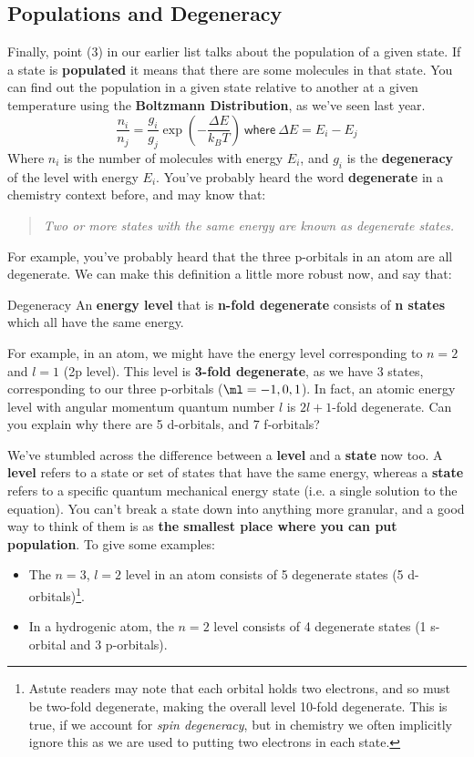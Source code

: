 \subsection{Populations and Degeneracy}
Finally, point (3) in our earlier list talks about the population of a given state. If a state is \textbf{populated} it means that there are some molecules in that state. You can find out the population in a given state relative to another at a given temperature using the \textbf{Boltzmann Distribution}, as we've seen last year. 
\begin{equation*}
\frac{n_i}{n_j} = \frac{g_i}{g_j}\exp\left(-\frac{\Delta E}{k_BT}\right) ~\mathsf{where}~ \Delta E = E_i - E_j
\end{equation*}
Where $n_i$ is the number of molecules with energy $E_i$, and $g_i$ is the \textbf{degeneracy} of the level with energy $E_i$. You've probably heard the word \textbf{degenerate} in a chemistry context before, and may know that:
\begin{quote}
\textit{Two or more states with the same energy are known as degenerate states.}
\end{quote}
For example, you've probably heard that the three p-orbitals in an atom are all degenerate. We can make this definition a little more robust now, and say that:

\begin{key}{Degeneracy}
An \textbf{energy level} that is \textbf{n-fold degenerate} consists of \textbf{n states} which all have the same energy.
\end{key}

For example, in an atom, we might have the energy level corresponding to $n=2$ and $l=1$ (2p level). This level is \textbf{3-fold degenerate}, as we have 3 states, corresponding to our three p-orbitals ($\ml = -1, 0, 1$). In fact, an atomic energy level with angular momentum quantum number $l$ is $2l+1$-fold degenerate. Can you explain why there are 5 d-orbitals, and 7 f-orbitals?

We've stumbled across the difference between a \textbf{level} and a \textbf{state} now too. A \textbf{level} refers to a state or set of states that have the same energy, whereas a \textbf{state} refers to a specific quantum mechanical energy state (i.e. a single solution to the \schro equation). You can't break a state down into anything more granular, and a good way to think of them is as \textbf{the smallest place where you can put population}. To give some examples:
\begin{itemize}
\item The $n=3$, $l=2$ level in an atom consists of 5 degenerate states (5 d-orbitals)\footnote{Astute readers may note that each orbital holds two electrons, and so must be two-fold degenerate, making the overall level 10-fold degenerate. This is true, if we account for \textit{spin degeneracy}, but in chemistry we often implicitly ignore this as we are used to putting two electrons in each state.}.
\item In a hydrogenic atom, the $n=2$ level consists of 4 degenerate states (1 s-orbital and 3 p-orbitals).
\end{itemize}

